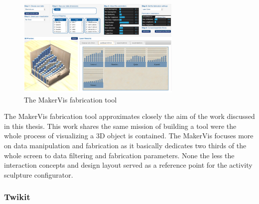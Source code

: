 \documentclass[../medieninformatik-arbeit.tex]{subfiles}
\begin{document}
\begin{figure}[h]
\begin{center}
  \includegraphics[width=0.7\textwidth]{RelatedWork/img/MakerVis}
  \caption{The MakerVis fabrication tool\cite{swaminathan2014supporting} }
\label{fig:makervis-config}
\end{center}
\end{figure}

The MakerVis fabrication tool approximates closely the aim of the work discussed in this thesis. This work shares the same mission of building a tool were the whole process of visualizing a 3D object is contained. The MakerVis focuses more on data manipulation and fabrication as it basically dedicates two thirds of the whole screen to data filtering and fabrication parameters. None the less the interaction concepts and design layout served as a reference point for the activity sculpture configurator. 

\subsubsection{Twikit}
\end{document}
